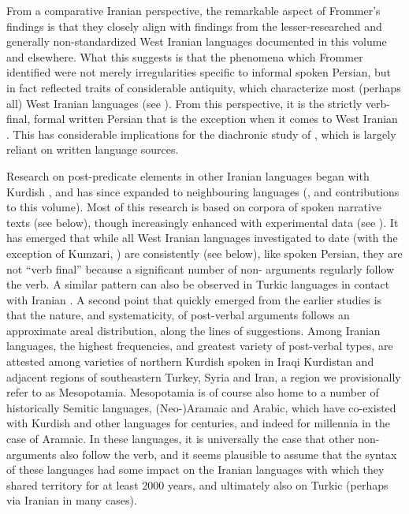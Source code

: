 \documentclass[output=paper,colorlinks,citecolor=brown,collectionchapter]{langscibook}
\begin{document}
From a comparative Iranian perspective, the remarkable aspect of Frommer's findings is that they closely align with findings from the lesser-researched and generally non-standardized West Iranian languages documented in this volume and elsewhere. What this suggests is that the phenomena which Frommer identified were not merely irregularities specific to informal spoken Persian, but in fact reflected  traits of considerable antiquity, which characterize most (perhaps all) West Iranian languages (see ). From this perspective, it is the strictly verb-final, formal written Persian that is the exception when it comes to West Iranian . This has considerable implications for the diachronic study of , which is largely reliant on written language sources.

Research on post-predicate elements in other Iranian languages began with Kurdish \citep{haig_vg-word_2011,haig_post-predicate_2014,Haig2022PostPredicateCon}, and has since expanded to neighbouring languages (\citealt{haig_verb-goal_2015,haig_western_2017,stilo_investigating_2018,Jahani2018Post-verbal,asadpour_typologizing_2022}, and contributions to this volume). Most of this research is based on corpora of spoken narrative texts (see below), though increasingly enhanced with experimental data (see ). It has emerged that while all West Iranian languages investigated to date (with the exception of Kumzari, \citealt{anonby_grammar_2015}) are consistently  (see below), like spoken Persian, they are not ``verb final'' because a significant number of non- arguments regularly follow the verb. A similar pattern can also be observed in Turkic languages in contact with Iranian \citep{schreiber_contact-induced_2021,stilo_oghuz_2021}. A second point that quickly emerged from the earlier studies is that the nature, and systematicity, of post-verbal arguments follows an approximate areal distribution, along the lines of  suggestions. Among Iranian  languages, the highest frequencies, and greatest variety of post-verbal  types, are attested among varieties of northern Kurdish spoken in Iraqi Kurdistan and adjacent regions of southeastern Turkey, Syria and Iran, a region we provisionally refer to as Mesopotamia. Mesopotamia is of course also home to a number of historically  Semitic languages, (Neo-)Aramaic and Arabic, which have co-existed with Kurdish and other  languages for centuries, and indeed for millennia in the case of Aramaic. In these  languages, it is universally the case that other non- arguments also follow the verb, and it seems plausible to assume that the syntax of these languages had some impact on the Iranian languages with which they shared territory for at least 2000 years, and ultimately also on Turkic (perhaps via Iranian in many cases).
\end{document}
